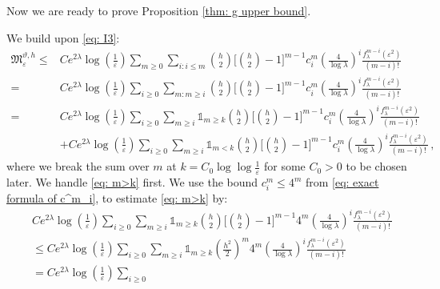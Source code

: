 \documentclass[a4paper,reqno,11pt]{amsart}
\makeatletter
\renewenvironment{proof}[1][\proofname]{\par
\pushQED{\qed}%
\normalfont \topsep4\p@\@plus4\p@\relax
\trivlist
\item[\hskip\labelsep
\bfseries
#1\@addpunct{.}]\ignorespaces
}{%
\popQED\endtrivlist\@endpefalse
}
\numberwithin{equation}{section}
\theoremstyle{mytheorem}
\newcommand{\gl}{\lambda}
\newcommand{\ind}{\mathds{1}}
\renewcommand{\epsilon}{\varepsilon}
\renewcommand{\theta}{\vartheta}
\newcommand\qa{\bigg[}
\newcommand\qb{\bigg]}
\newcommand\ra{\left(}
\newcommand\rb{\right)}
\newcommand{\f}{\frac}
\newcommand{\dlog}{\log\log}
\makeatother
\begin{document}
{Now we are ready to prove Proposition \ref{thm: g upper bound}.
\begin{proof}[Proof of Proposition \ref{thm: g upper bound}]
We build upon \eqref{eq: I3}: 
\begin{align}
        \mathfrak{M}_\epsilon^{\theta,h}
        \le &  
        C e^{2\gl}
        \log \ra \f{1}{\epsilon} \rb
        \sum_{m\ge 0}
        \sum_{i: i\le m}
        {h\choose 2}
        \qa
        {h\choose 2}-1      
        \qb^{m-1} 
        c^m_i
        \ra \f{4}{\log\gl} \rb^i
        \frac{f^{m-i}_\gl(\epsilon^2)}{(m-i)!}\\
        = &  
        C e^{2\gl}
        \log \ra \f{1}{\epsilon} \rb
        \sum_{i\ge 0}
        \sum_{m: m \ge i}
        {h\choose 2}
        \qa
        {h\choose 2}-1      
        \qb^{m-1} 
        c^m_i
        \ra \f{4}{\log\gl} \rb^i
        \frac{f^{m-i}_\gl(\epsilon^2)}{(m-i)!}\\
        = &  \label{eq: m>k}
        C e^{2\gl}
        \log \ra \f{1}{\epsilon} \rb
        \sum_{i\ge 0}
        \sum_{m \geq i} \ind_{m \geq k}
        {h\choose 2}
        \qa
        {h\choose 2}-1      
        \qb^{m-1} 
        c^m_i
        \ra \f{4}{\log\gl} \rb^i
        \frac{f^{m-i}_\gl(\epsilon^2)}{(m-i)!}\\
        & + \label{eq: m<k}
        C e^{2\gl}
        \log \ra \f{1}{\epsilon} \rb
        \sum_{i\ge 0}
        \sum_{m\ge i}
        \ind_{m<k}
        {h\choose 2}
        \qa
        {h\choose 2}-1      
        \qb^{m-1} 
        c^m_i
        \ra \f{4}{\log\gl} \rb^i
        \frac{f^{m-i}_\gl(\epsilon^2)}{(m-i)!} \,,
\end{align}
where we break the sum over $m$ at $k=C_0 \dlog\f{1}{\epsilon}$ for some $C_0>0$ to be chosen later. We handle \eqref{eq: m>k} first. 
We use the bound $c^m_i \leq 4^m$ from \eqref{eq: exact formula of c^m_i}, to estimate \eqref{eq: m>k} by: 
\begin{align*}
        &  C e^{2\gl} \log(\f{1}{\epsilon})
        \sum_{i \ge 0}
        \sum_{m \ge i } \ind_{m\geq k}
        {h\choose 2} \qa {h\choose 2} -1 \qb^{m-1} 4^m
        \ra \f{4}{\log\gl} \rb^i
        \frac{f_\gl^{m-i}(\epsilon^2)}{(m-i)!} \\
        & \le C e^{2\gl} \log(\f{1}{\epsilon})
        \sum_{i \ge 0}
        \sum_{m \geq i } \ind_{m\geq k}
        \ra \f{h^2}{2} \rb^m 4^m
        \ra \f{4}{\log\gl} \rb^i
        \frac{f_\gl^{m-i}(\epsilon^2)}{(m-i)!} \\
        & = C e^{2\gl} \log(\f{1}{\epsilon})
        \sum_{i \ge 0}

\end{align*}
\end{proof}}
\end{document}
